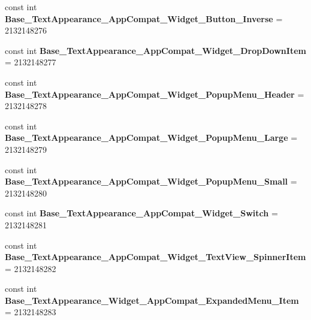 \begin{DoxyCompactItemize}
const int {\bfseries Base\+\_\+\+Text\+Appearance\+\_\+\+App\+Compat\+\_\+\+Widget\+\_\+\+Button\+\_\+\+Inverse} = 2132148276
\item 
\mbox{\label{classst_delivery_1_1_resource_1_1_style_a647bf00e61c98b23eac64c7d216ae598}} 
const int {\bfseries Base\+\_\+\+Text\+Appearance\+\_\+\+App\+Compat\+\_\+\+Widget\+\_\+\+Drop\+Down\+Item} = 2132148277
\item 
\mbox{\label{classst_delivery_1_1_resource_1_1_style_a8c1d177c28351c78edc202e4b6170132}} 
const int {\bfseries Base\+\_\+\+Text\+Appearance\+\_\+\+App\+Compat\+\_\+\+Widget\+\_\+\+Popup\+Menu\+\_\+\+Header} = 2132148278
\item 
\mbox{\label{classst_delivery_1_1_resource_1_1_style_aa37f8b4773ef062c55a4daeb74f69257}} 
const int {\bfseries Base\+\_\+\+Text\+Appearance\+\_\+\+App\+Compat\+\_\+\+Widget\+\_\+\+Popup\+Menu\+\_\+\+Large} = 2132148279
\item 
\mbox{\label{classst_delivery_1_1_resource_1_1_style_a4f9c3a0f90c671a9b0ca396005711c43}} 
const int {\bfseries Base\+\_\+\+Text\+Appearance\+\_\+\+App\+Compat\+\_\+\+Widget\+\_\+\+Popup\+Menu\+\_\+\+Small} = 2132148280
\item 
\mbox{\label{classst_delivery_1_1_resource_1_1_style_a6cbaa2f347173ba9dd19a2096b5c53a9}} 
const int {\bfseries Base\+\_\+\+Text\+Appearance\+\_\+\+App\+Compat\+\_\+\+Widget\+\_\+\+Switch} = 2132148281
\item 
\mbox{\label{classst_delivery_1_1_resource_1_1_style_a2942e827cbfcc0f7a6c1109438c436fd}} 
const int {\bfseries Base\+\_\+\+Text\+Appearance\+\_\+\+App\+Compat\+\_\+\+Widget\+\_\+\+Text\+View\+\_\+\+Spinner\+Item} = 2132148282
\item 
\mbox{\label{classst_delivery_1_1_resource_1_1_style_a3e8ed894e0ed6017cb247eceea4171ab}} 
const int {\bfseries Base\+\_\+\+Text\+Appearance\+\_\+\+Widget\+\_\+\+App\+Compat\+\_\+\+Expanded\+Menu\+\_\+\+Item} = 2132148283
\item 

\end{DoxyCompactItemize}
